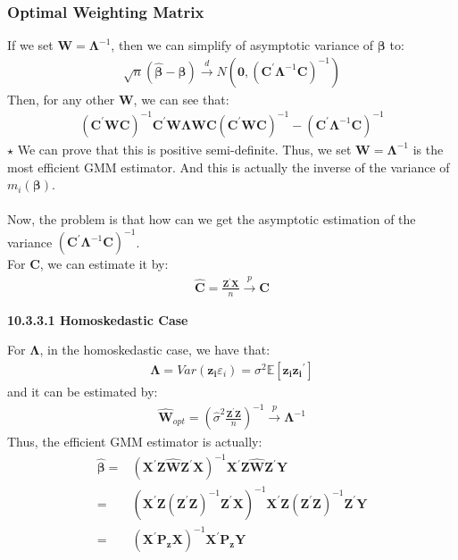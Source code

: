 \documentclass{article}
\begin{document}
\subsubsection{Optimal Weighting Matrix}
If we set $\boldsymbol{W} = \boldsymbol{\Lambda}^{-1}$, then we can simplify of asymptotic variance of $\boldsymbol{\beta}$ to:
	\begin{align*}
		\sqrt{n}(\hat{\boldsymbol{\beta}} - \boldsymbol{\beta}) \xrightarrow{d} N(\boldsymbol{0}, (\boldsymbol{C}^\prime \boldsymbol{\Lambda}^{-1} \boldsymbol{C})^{-1})
	\end{align*}
Then, for any other $\boldsymbol{W}$, we can see that:
	\begin{align*}
		(\boldsymbol{C}^\prime \boldsymbol{W} \boldsymbol{C})^{-1} \boldsymbol{C}^\prime \boldsymbol{W} \boldsymbol{\Lambda} \boldsymbol{W} \boldsymbol{C} (\boldsymbol{C}^\prime \boldsymbol{W} \boldsymbol{C})^{-1} - (\boldsymbol{C}^\prime \boldsymbol{\Lambda}^{-1} \boldsymbol{C})^{-1}
	\end{align*}
$\star$ We can prove that this is positive semi-definite. Thus, we set $\boldsymbol{W} = \boldsymbol{\Lambda}^{-1}$ is the most efficient GMM estimator. And this is actually the inverse of the variance of $m_i(\boldsymbol{\beta})$.\\\\ 
Now, the problem is that how can we get the asymptotic estimation of the variance $(\boldsymbol{C}^\prime \boldsymbol{\Lambda}^{-1} \boldsymbol{C})^{-1}$.\\
For $\boldsymbol{C}$, we can estimate it by:
	\begin{align*}
		\hat{\boldsymbol{C}} = \frac{\boldsymbol{Z}^\prime \boldsymbol{X}}{n} \xrightarrow{p} \boldsymbol{C} 
	\end{align*}
\centerline{\textbf{10.3.3.1 Homoskedastic Case}}
For $\boldsymbol{\Lambda}$, in the homoskedastic case, we have that:
	\begin{align*}
		\boldsymbol{\Lambda} = Var(\boldsymbol{z_i}\varepsilon_i) = \sigma^2 \mathbb{E} [\boldsymbol{z_i} \boldsymbol{z_i}^\prime]
	\end{align*}
and it can be estimated by:
	\begin{align*}
		\hat{\boldsymbol{W}}_{opt} = \left( \hat{\sigma}^2 \frac{\boldsymbol{Z}^\prime \boldsymbol{Z}}{n} \right)^{-1} \xrightarrow{p} \boldsymbol{\Lambda}^{-1}
	\end{align*}
Thus, the efficient GMM estimator is actually:
	\begin{align*}
		\hat{\boldsymbol{\beta}} = &(\boldsymbol{X}^\prime \boldsymbol{Z} \hat{\boldsymbol{W}} \boldsymbol{Z}^\prime \boldsymbol{X})^{-1} \boldsymbol{X}^\prime \boldsymbol{Z} \hat{\boldsymbol{W}} \boldsymbol{Z}^\prime \boldsymbol{Y}\\ = &
		(\boldsymbol{X}^\prime \boldsymbol{Z} (\boldsymbol{Z}^\prime \boldsymbol{Z})^{-1} \boldsymbol{Z}^\prime \boldsymbol{X})^{-1} \boldsymbol{X}^\prime \boldsymbol{Z} (\boldsymbol{Z}^\prime \boldsymbol{Z})^{-1} \boldsymbol{Z}^\prime \boldsymbol{Y}\\ = &
		(\boldsymbol{X}^\prime \boldsymbol{P_z} \boldsymbol{X})^{-1} \boldsymbol{X}^\prime \boldsymbol{P_z} \boldsymbol{Y}
	\end{align*}
\end{document}
